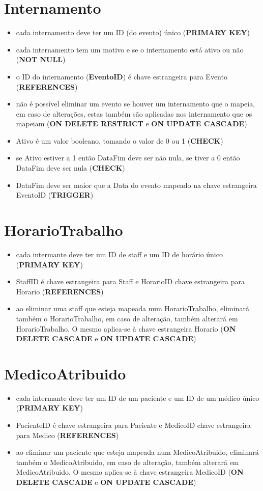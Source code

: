 \documentclass[article, a4paper, 12pt, oneside]{memoir}
\begin{document}
\section*{Internamento}
\begin{itemize}
	\item cada internamento deve ter um ID (do evento) único (\textbf{PRIMARY KEY})
	\item cada internamento tem um motivo e se o internamento está ativo ou não (\textbf{NOT NULL})
	\item o ID do internamento (\textbf{EventoID}) é chave estrangeira para Evento (\textbf{REFERENCES})
	\item não é possível eliminar um evento se houver um internamento que o mapeia, em caso de alterações, estas também são aplicadas nos internamento que os mapeiam (\textbf{ON DELETE RESTRICT} e \textbf{ON UPDATE CASCADE})
	\item Ativo é um valor booleano, tomando o valor de 0 ou 1 (\textbf{CHECK})
	\item se Ativo estiver a 1 então DataFim deve ser não nula, se tiver a 0 então DataFim deve ser nula (\textbf{CHECK})
	\item DataFim deve ser maior que a Data do evento mapeado na chave estrangeira EventoID (\textbf{TRIGGER})
\end{itemize}

\section*{HorarioTrabalho}
\begin{itemize}
	\item cada intermante deve ter um ID de staff e um ID de horário único (\textbf{PRIMARY KEY})
	\item StaffID é chave estrangeira para Staff e HorarioID chave estrangeira para Horario (\textbf{REFERENCES})
	\item ao eliminar uma staff que esteja mapeada num HorarioTrabalho, eliminará também o HorarioTrabalho, em caso de alteração, também alterará em HorarioTrabalho. O mesmo aplica-se à chave estrangeira Horario (\textbf{ON DELETE CASCADE} e \textbf{ON UPDATE CASCADE})
\end{itemize}

\section*{MedicoAtribuido}
\begin{itemize}
	\item cada intermante deve ter um ID de um paciente e um ID de um médico único (\textbf{PRIMARY KEY})
	\item PacienteID é chave estrangeira para Paciente e MedicoID chave estrangeira para Medico (\textbf{REFERENCES})
	\item ao eliminar um paciente que esteja mapeada num MedicoAtribuido, eliminará também o MedicoAtribuido, em caso de alteração, também alterará em MedicoAtribuido. O mesmo aplica-se à chave estrangeira MedicoID (\textbf{ON DELETE CASCADE} e \textbf{ON UPDATE CASCADE})
\end{itemize}
\end{document}
